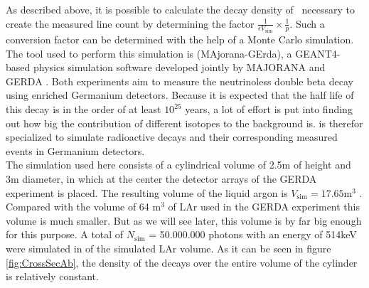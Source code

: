 \documentclass[encoding=utf8,british]{tumphthesis}
\begin{document}
As described above, it is possible to calculate the decay density of \Kr\ necessary to create the measured line count by determining the factor $\frac{1}{\epsilon V_{\mathrm{sim}}} \times \frac{1}{p}$. 
Such a conversion factor can be determined with the help of a Monte Carlo simulation.
The tool used to perform this simulation is \mage (MAjorana-GErda), a GEANT4-based physics simulation software developed jointly by MAJORANA and GERDA \cite{boswell_mage_2010}.
Both experiments aim to measure the neutrinoless double beta decay using enriched Germanium detectors.
Because it is expected that the half life of this decay is in the order of at least \(10^{25}\) years, a lot of effort is put into finding out how big the contribution of different isotopes to the background is.
\mage is therefor specialized to simulate radioactive decays and their corresponding measured events in Germanium detectors.
\\

The simulation used here consists of a cylindrical volume of 2.5m of height and 3m diameter, in which at the center the detector arrays of the GERDA experiment is placed.
The resulting volume of the liquid argon is $V_{\mathrm{sim}} = 17.65 \mathrm{m}^3$ .
Compared with the volume of 64 m\(^3\) of LAr used in the GERDA experiment this volume is much smaller.
But as we will see later, this volume is by far big enough for this purpose.
A total of $N_{\mathrm{sim}}$ = 50.000.000 photons with an energy of 514keV were simulated in of the simulated LAr volume. 
As it can be seen in figure \ref{fig:CrossSecAb}, the density of the decays over the entire volume of the cylinder is relatively constant.
\\
\end{document}
